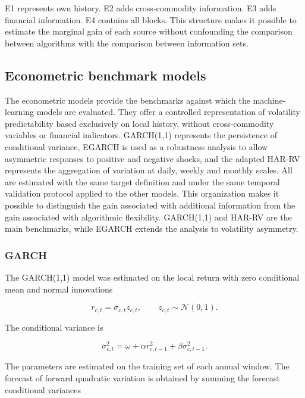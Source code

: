 \documentclass[a4paper,fleqn]{cas-sc}
\begin{document}
E1 represents own history. E2 adds cross-commodity information. E3 adds financial information. E4 contains all blocks. This structure makes it possible to estimate the marginal gain of each source without confounding the comparison between algorithms with the comparison between information sets.

\subsection{Econometric benchmark models}
\label{subsec:econometric_models}

The econometric models provide the benchmarks against which the machine-learning models are evaluated. They offer a controlled representation of volatility predictability based exclusively on local history, without cross-commodity variables or financial indicators. GARCH(1,1) represents the persistence of conditional variance, EGARCH is used as a robustness analysis to allow asymmetric responses to positive and negative shocks, and the adapted HAR-RV represents the aggregation of variation at daily, weekly and monthly scales. All are estimated with the same target definition and under the same temporal validation protocol applied to the other models. This organization makes it possible to distinguish the gain associated with additional information from the gain associated with algorithmic flexibility. GARCH(1,1) and HAR-RV are the main benchmarks, while EGARCH extends the analysis to volatility asymmetry.

\subsubsection{GARCH}

The GARCH(1,1) model was estimated on the local return with zero conditional mean and normal innovations \citep{Bollerslev1986GARCH}

\begin{equation}
r_{c,t}=\sigma_{c,t}z_{c,t},
\qquad
z_{c,t}\sim\mathcal{N}(0,1).
\label{eq:garch_return}
\end{equation}

The conditional variance is

\begin{equation}
\sigma_{c,t}^{2}
=
\omega
+\alpha r_{c,t-1}^{2}
+\beta\sigma_{c,t-1}^{2}.
\label{eq:garch}
\end{equation}

The parameters are estimated on the training set of each annual window. The forecast of forward quadratic variation is obtained by summing the forecast conditional variances
\end{document}
